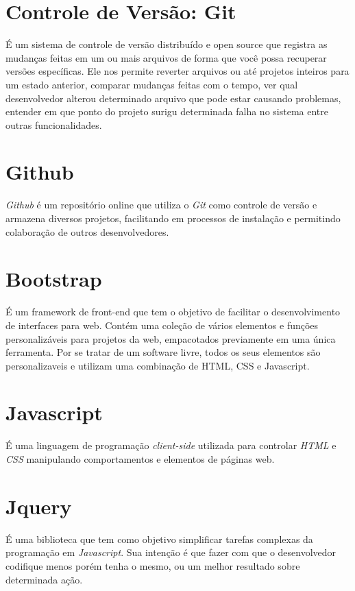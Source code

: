     \section{Controle de Versão: Git\label{sec:git}}
        É um sistema de controle de versão distribuído e open source que registra as mudanças feitas em um ou mais arquivos de forma que você possa recuperar versões específicas. Ele nos permite reverter arquivos ou até projetos inteiros para um estado anterior, comparar mudanças feitas com o tempo, ver qual desenvolvedor alterou determinado arquivo que pode estar causando problemas, entender em que ponto do projeto surigu determinada falha no sistema entre outras funcionalidades.

    \section{Github\label{sec:github}}
        \emph{Github} é um repositório online que utiliza o \emph{Git} como controle de versão e armazena diversos projetos, facilitando em processos de instalação e permitindo colaboração de outros desenvolvedores.


    \section{Bootstrap\label{sec:bootstrap}}
        É um framework de front-end que tem o objetivo de facilitar o desenvolvimento de interfaces para web. Contém uma coleção de vários elementos e funções personalizáveis para projetos da web, empacotados previamente em uma única ferramenta. Por se tratar de um software livre, todos os seus elementos são personalizaveis e utilizam uma combinação de HTML, CSS e Javascript.

    \section{Javascript\label{sec:javascript}}
        É uma linguagem de programação \emph{client-side} utilizada para controlar \emph{HTML} e \emph{CSS} manipulando comportamentos e elementos de páginas web.


    \section{Jquery\label{sec:jquery}}
        É uma biblioteca que tem como objetivo simplificar tarefas complexas da programação em \emph{Javascript}. Sua intenção é que fazer com que o desenvolvedor codifique menos porém tenha o mesmo, ou um melhor resultado sobre determinada ação.

